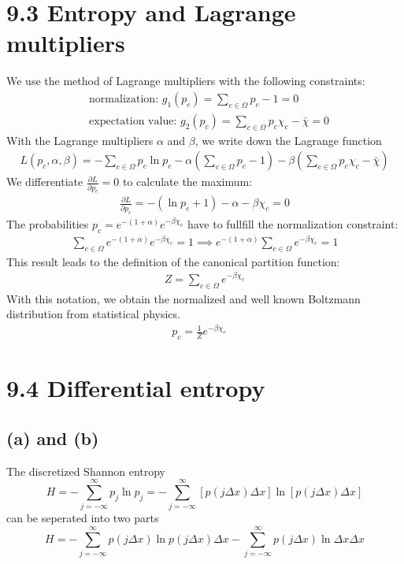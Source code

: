 \documentclass{article}
\begin{document}
\section*{9.3 Entropy and Lagrange multipliers}
We use the method of Lagrange multipliers with the following constraints:
\begin{align}
& \text{normalization: } g_1(p_c) = \sum_{c\in\Omega} p_c - 1 = 0 \\
& \text{expectation value: } g_2(p_c) = \sum_{c\in\Omega} p_c \chi_c - \bar{\chi} = 0
\end{align}
With the Lagrange multipliers $\alpha$ and $\beta$, we write down the Lagrange function
\begin{align}
L(p_c, \alpha, \beta) = -\sum_{c\in\Omega} p_c \ln p_c - \alpha \left( \sum_{c\in\Omega} p_c - 1 \right) - \beta \left( \sum_{c\in\Omega} p_c \chi_c - \bar{\chi} \right)
\end{align}
We differentiate $\frac{\partial L}{\partial p_c}=0$ to calculate the maximum:
\begin{align}
\frac{\partial L}{\partial p_c} = -(\ln p_c + 1) - \alpha - \beta \chi_c = 0
\end{align}
The probabilities $p_c = e^{-(1+\alpha)} e^{-\beta \chi_c}$ have to fullfill the normalization constraint:
\begin{align}
    \sum_{c\in\Omega} e^{-(1+\alpha)} e^{-\beta \chi_c} = 1 \implies e^{-(1+\alpha)} \sum_{c\in\Omega} e^{-\beta \chi_c} = 1
\end{align}
This result leads to the definition of the canonical partition function:
\begin{align}
    Z = \sum_{c\in\Omega} e^{-\beta \chi_c}
\end{align}
With this notation, we obtain the normalized and well known Boltzmann distribution from statistical physics.
\begin{align}
    p_c = \frac{1}{Z} e^{-\beta \chi_c} \quad
\end{align}

\section*{9.4 Differential entropy}
\subsection*{(a) and (b)}
The discretized Shannon entropy
$$H = - \sum_{j=-\infty}^{\infty} p_j \ln p_j = - \sum_{j=-\infty}^{\infty} \left[ p(j \Delta x) \Delta x \right] \ln \left[ p(j \Delta x) \Delta x \right]$$
can be seperated into two parts
$$H = - \sum_{j=-\infty}^{\infty} p(j \Delta x) \ln p(j \Delta x) \Delta x - \sum_{j=-\infty}^{\infty} p(j \Delta x) \ln \Delta x \Delta x$$
\end{document}

